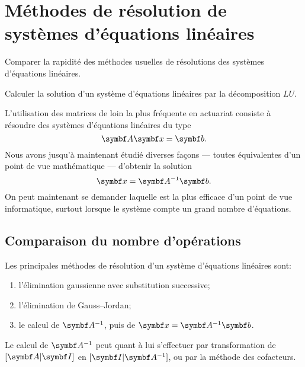 
\chapter{Méthodes de résolution de systèmes d'équations linéaires}
\label{chap:decomposition}

\begin{objectifs}
\item Comparer la rapidité des méthodes usuelles de résolutions des
  systèmes d'équations linéaires.
\item Calculer la solution d'un système d'équations linéaires par la
  décomposition $LU$.
\end{objectifs}

L'utilisation des matrices de loin la plus fréquente en actuariat
consiste à résoudre des systèmes d'équations linéaires du type
\begin{displaymath}
  \mat{A} \mat{x} = \mat{b}.
\end{displaymath}
Nous avons jusqu'à maintenant étudié diverses façons --- toutes
équivalentes d'un point de vue mathématique --- d'obtenir la solution
\begin{displaymath}
  \mat{x} = \mat{A}^{-1} \mat{b}.
\end{displaymath}
On peut maintenant se demander laquelle est la plus efficace d'un
point de vue informatique, surtout lorsque le système compte un grand
nombre d'équations.


\section{Comparaison du nombre d'opérations}
\label{sec:decomposition:nombre_operations}

Les principales méthodes de résolution d'un système d'équations
li\-néai\-res sont:
\begin{enumerate}
\item l'élimination gaussienne avec substitution successive;
\item l'élimination de Gauss--Jordan;
\item le calcul de $\mat{A}^{-1}$, puis de $\mat{x} = \mat{A}^{-1}
  \mat{b}$.
\end{enumerate}
Le calcul de $\mat{A}^{-1}$ peut quant à lui s'effectuer par
transformation de $[\mat{A}|\mat{I}]$ en $[\mat{I}|\mat{A}^{-1}]$, ou
par la méthode des cofacteurs.

